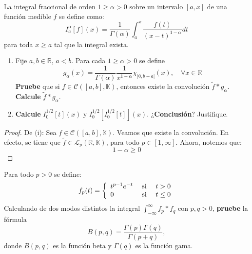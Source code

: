 \documentclass[12pt]{report}
\newcounter{it}
\theoremstyle{largebreak}
\begin{document}
    \begin{excer}
        La integral fraccional de orden $1\geq\alpha>0$ sobre un intervalo $[a,x]$ de una función medible $f$ se define como:
        \begin{equation*}
            I_a^\alpha[f](x)=\frac{1}{\Gamma(\alpha)}\int_a^x\frac{f(t)}{(x-t)^{1-\alpha}}dt
        \end{equation*}
        para toda $x\geq a$ tal que la integral exista.
        \begin{enumerate}
            \item Fije $a,b\in\mathbb{R}$, $a<b$. Para cada $1\geq\alpha>0$ se define
            \begin{equation*}
                g_\alpha(x)=\frac{1}{\Gamma(\alpha)}\frac{1}{x^{1-\alpha}}\chi_{]0,b-a[}(x),\quad\forall x\in\mathbb{R}
            \end{equation*}
            \textbf{Pruebe} que si $f\in\mathcal{C}([a,b],\mathbb{K})$, entonces existe la convolución $\widetilde{f}*g_\alpha$. \textbf{Calcule} $\widetilde{f}*g_\alpha$.

            \item \textbf{Calcule} $I_0^{1/2}[t](x)$ y $I_0^{1/2}[I_0^{1/2}[t]](x)$. ¿\textbf{Conclusión}? Justifique.
        \end{enumerate}
    \end{excer}

    \begin{proof}
        De (i): Sea $f\in\mathcal{C}([a,b],\mathbb{K})$. Veamos que existe la convolución. En efecto, se tiene que $\widetilde{f}\in\mathcal{L}_p(\mathbb{R},\mathbb{K})$, para todo $p\in[1,\infty]$. Ahora, notemos que:
        \begin{equation*}
            1-\alpha\geq0
        \end{equation*}
    \end{proof}

    \begin{excer}
        Para todo $p>0$ se define:
        \begin{equation*}
            f_p(t)=\left\{\begin{array}{lcr}
                t^{p-1}e^{-t} & \textup{ si }& t>0\\
                0 & \textup{ si } & t\leq 0\\
            \end{array}
            \right.
        \end{equation*}
        Calculando de dos modos distintos la integral $\int_{-\infty}^\infty f_p*f_q$ con $p,q>0$, \textbf{pruebe} la fórmula
        \begin{equation*}
            B(p,q)=\frac{\Gamma(p)\Gamma(q)}{\Gamma(p+q)},
        \end{equation*}
        donde $B(p,q)$ es la función beta y $\Gamma(q)$ es la función gama.
    \end{excer}
    
\end{document}
